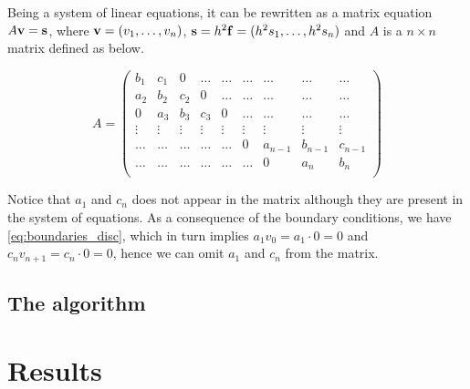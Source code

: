\documentclass[a4paper]{article}
\begin{document}
Being a system of linear equations, it can be rewritten as a matrix equation $A {\bf v} = {\bf s}$, where ${\bf v} = (v_1, \dots, v_{n})$, ${\bf s} = h^2 {\bf f} = (h^2 s_1, \dots, h^2 s_{n})$ and $A$ is a $n \times n$ matrix defined as below.

\begin{equation}
     A = \left(\begin{array}{ccccccccc}
                   b_1 & c_1 & 0 &\dots   & \dots &\dots & \dots &\dots&\dots\\
                   a_2 & b_2 & c_2 & 0 &\dots &\dots & \dots&\dots&\dots \\
                   0 & a_3 & b_3 & c_3 & 0 & \dots & \dots&\dots&\dots \\
                   \vdots&\vdots&\vdots&\vdots&\vdots&\vdots&\vdots&\vdots&\vdots \\
                   \dots&\dots&\dots&\dots&\dots & 0 & a_{n-1}  &b_{n-1}& c_{n-1} \\
                   \dots&\dots&\dots&\dots&\dots&\dots &  0 &a_n & b_n \\
              \end{array} \right)
\end{equation}

Notice that $a_1$ and $c_{n}$ does not appear in the matrix although they are present in the system of equations. As a consequence of the boundary conditions, we have \eqref{eq:boundaries_disc}, which in turn implies $a_1 v_{0} = a_1 \cdot 0 = 0$ and $c_n v_{n+1} = c_n \cdot 0 = 0$, hence we can omit $a_1$ and $c_{n}$ from the matrix.



\subsection{The algorithm}


\section{Results}
\end{document}
